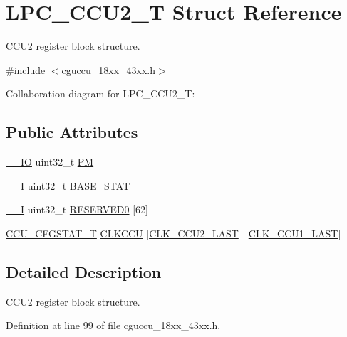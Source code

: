 \hypertarget{struct_l_p_c___c_c_u2___t}{}\section{L\+P\+C\+\_\+\+C\+C\+U2\+\_\+T Struct Reference}
\label{struct_l_p_c___c_c_u2___t}


C\+C\+U2 register block structure.  




{\ttfamily \#include $<$cguccu\+\_\+18xx\+\_\+43xx.\+h$>$}



Collaboration diagram for L\+P\+C\+\_\+\+C\+C\+U2\+\_\+T\+:
\subsection*{Public Attributes}
\begin{DoxyCompactItemize}
\item 
\hyperlink{core__sc300_8h_aec43007d9998a0a0e01faede4133d6be}{\+\_\+\+\_\+\+IO} uint32\+\_\+t \hyperlink{struct_l_p_c___c_c_u2___t_a994d8116ca6b9af03eb8568c479aff0c}{PM}
\item 
\hyperlink{core__sc300_8h_af63697ed9952cc71e1225efe205f6cd3}{\+\_\+\+\_\+I} uint32\+\_\+t \hyperlink{struct_l_p_c___c_c_u2___t_ae3e9e6d8a8300207c871459a610cdeba}{B\+A\+S\+E\+\_\+\+S\+T\+AT}
\item 
\hyperlink{core__sc300_8h_af63697ed9952cc71e1225efe205f6cd3}{\+\_\+\+\_\+I} uint32\+\_\+t \hyperlink{struct_l_p_c___c_c_u2___t_a97cef166775797bdbe093cd4022ab36f}{R\+E\+S\+E\+R\+V\+E\+D0} \mbox{[}62\mbox{]}
\item 
\hyperlink{struct_c_c_u___c_f_g_s_t_a_t___t}{C\+C\+U\+\_\+\+C\+F\+G\+S\+T\+A\+T\+\_\+T} \hyperlink{struct_l_p_c___c_c_u2___t_a5ebb8c88a4974448db291ac14796e845}{C\+L\+K\+C\+CU} \mbox{[}\hyperlink{chip__clocks_8h_a500a6084ba2d6361fa16b75205a8a513a5623cc59964cc18fc2717e74b819071a}{C\+L\+K\+\_\+\+C\+C\+U2\+\_\+\+L\+A\+ST} -\/ \hyperlink{chip__clocks_8h_a500a6084ba2d6361fa16b75205a8a513af43f3366ad619d1ac63ac44a6efc0343}{C\+L\+K\+\_\+\+C\+C\+U1\+\_\+\+L\+A\+ST}\mbox{]}
\end{DoxyCompactItemize}


\subsection{Detailed Description}
C\+C\+U2 register block structure. 

Definition at line 99 of file cguccu\+\_\+18xx\+\_\+43xx.\+h.



